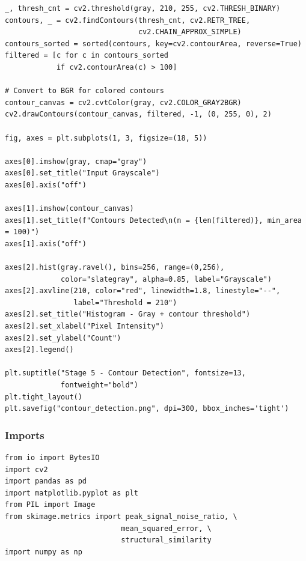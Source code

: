\documentclass[12pt,a4paper]{article}
\begin{document}
\begin{lstlisting}
_, thresh_cnt = cv2.threshold(gray, 210, 255, cv2.THRESH_BINARY)
contours, _ = cv2.findContours(thresh_cnt, cv2.RETR_TREE, 
                               cv2.CHAIN_APPROX_SIMPLE)
contours_sorted = sorted(contours, key=cv2.contourArea, reverse=True)
filtered = [c for c in contours_sorted 
            if cv2.contourArea(c) > 100]

# Convert to BGR for colored contours
contour_canvas = cv2.cvtColor(gray, cv2.COLOR_GRAY2BGR)
cv2.drawContours(contour_canvas, filtered, -1, (0, 255, 0), 2)

fig, axes = plt.subplots(1, 3, figsize=(18, 5))

axes[0].imshow(gray, cmap="gray")
axes[0].set_title("Input Grayscale")
axes[0].axis("off")

axes[1].imshow(contour_canvas)
axes[1].set_title(f"Contours Detected\n(n = {len(filtered)}, min_area = 100)")
axes[1].axis("off")

axes[2].hist(gray.ravel(), bins=256, range=(0,256), 
             color="slategray", alpha=0.85, label="Grayscale")
axes[2].axvline(210, color="red", linewidth=1.8, linestyle="--", 
                label="Threshold = 210")
axes[2].set_title("Histogram - Gray + contour threshold")
axes[2].set_xlabel("Pixel Intensity")
axes[2].set_ylabel("Count")
axes[2].legend()

plt.suptitle("Stage 5 - Contour Detection", fontsize=13, 
             fontweight="bold")
plt.tight_layout()
plt.savefig("contour_detection.png", dpi=300, bbox_inches='tight')
\end{lstlisting}

\subsubsection{Imports}

\begin{lstlisting}
from io import BytesIO
import cv2
import pandas as pd
import matplotlib.pyplot as plt
from PIL import Image
from skimage.metrics import peak_signal_noise_ratio, \
                           mean_squared_error, \
                           structural_similarity
import numpy as np
\end{lstlisting}
\end{document}
